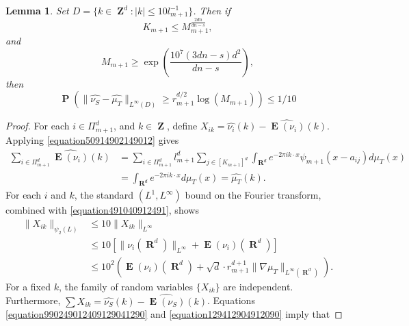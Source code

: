 \documentclass[12pt,reqno]{article}
\numberwithin{equation}{section}
\DeclareMathOperator{\RR}{\mathbf{R}}
\DeclareMathOperator{\ZZ}{\mathbf{Z}}
\newtheorem{lemma}[theorem]{Lemma}
\DeclareMathOperator{\EE}{\mathbf{E}}
\DeclareMathOperator{\PP}{\mathbf{P}}
\newcommand{\psitwo}[1]{\| {#1} \|_{\psi_2(L)}}
\begin{document}
\begin{lemma} \label{deviationLemma}
    Set $D = \{ k \in \ZZ^d: |k| \leq 10l_{m+1}^{-1} \}$. Then if
    \begin{equation} \label{equation109519029012}
        K_{m+1} \leq M_{m+1}^{\frac{2dn}{dn - s}},
    \end{equation}
    and
    \begin{equation} \label{equation1940129041}
        M_{m+1} \geq \exp \left( \frac{10^7 (3dn - s) d^2}{dn - s} \right),
    \end{equation}
    then
    \[ \PP \left( \| \widehat{\nu_S} - \widehat{\mu_T} \|_{L^\infty(D)} \geq r_{m+1}^{d/2} \log(M_{m+1}) \right) \leq 1/10 \]
\end{lemma}
\begin{proof}
    For each $i \in \Pi_{m+1}^d$, and $k \in \ZZ$, define $X_{ik} = \widehat{\nu_i}(k) - \widehat{\EE(\nu_i)}(k)$. Applying \eqref{equation50914902149012} gives 
    \begin{equation} \label{equation891248921894128942189}
    \begin{split}
        \sum_{i \in \Pi_{m+1}^d} \widehat{\EE(\nu_i)}(k) &= \sum_{i \in \Pi_{m+1}^d} l_{m+1}^d \sum_{j \in [K_{m+1}]^d} \int_{\RR^d} e^{- 2 \pi i k \cdot x} \psi_{m+1}(x - a_{ij}) d\mu_T(x)\\
        &= \int_{\RR^d} e^{-2 \pi i k \cdot x} d\mu_T(x) = \widehat{\mu_T}(k).
    \end{split}
    \end{equation}
    For each $i$ and $k$, the standard $(L^1,L^\infty)$ bound on the Fourier transform, combined with \eqref{equation491040912491}, shows
    \begin{equation} \label{equation12904912049012}
    \begin{split}
        \psitwo{X_{ik}} &\leq 10 \| X_{ik} \|_{L^\infty}\\
        &\leq 10[\| \nu_i(\RR^d) \|_{L^\infty} + \EE(\nu_i)(\RR^d)]\\
        &\leq 10^2 \left( \EE(\nu_i)(\RR^d) + \sqrt{d} \cdot r_{m+1}^{d+1} \| \nabla \mu_T \|_{L^\infty(\RR^d)} \right).
    \end{split}
    \end{equation}
    For a fixed $k$, the family of random variables $\{ X_{ik} \}$ are independent. Furthermore, $\sum X_{ik} = \widehat{\nu_S}(k) - \widehat{\EE(\nu_S)}(k)$. Equations \eqref{equation990249012409129041290} and \eqref{equation129412904912090} imply that

\end{proof}
\end{document}
